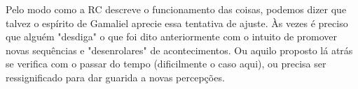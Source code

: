 \documentclass[12pt, oneside,twocolumns, a4paper, brazil]{abntex2}
\begin{document}
Pelo modo como a RC descreve o funcionamento das coisas, podemos dizer que talvez o espírito de Gamaliel aprecie essa tentativa de ajuste. Às vezes é preciso que alguém "desdiga" o que foi dito anteriormente com o intuito de promover novas sequências e "desenrolares" de acontecimentos. Ou aquilo proposto lá atrás se verifica com o passar do tempo (dificilmente o caso aqui), ou precisa ser ressignificado para dar guarida a novas percepções.


\end{document}
